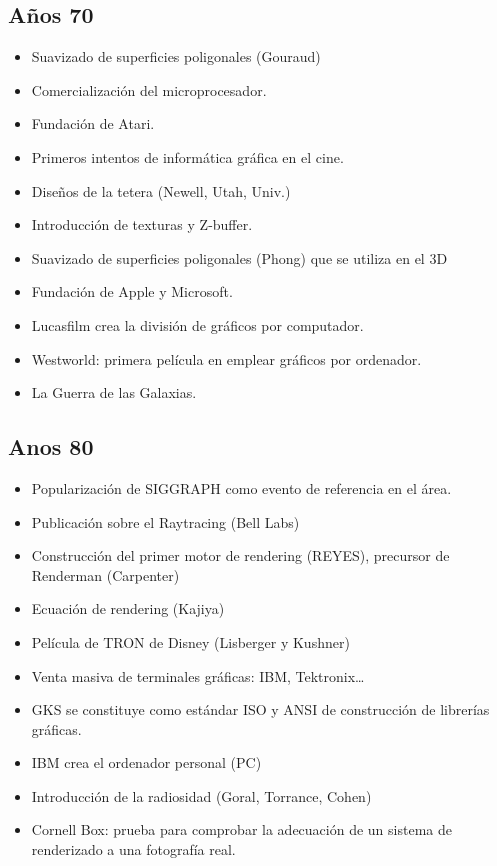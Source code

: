 \subsection{Años 70}\label{subsec:años-70}
\begin{itemize}
	\item Suavizado de superficies poligonales (Gouraud)
	\item Comercialización del microprocesador.
	\item Fundación de Atari.
	\item Primeros intentos de informática gráfica en el cine.
	\item Diseños de la tetera (Newell, Utah, Univ.)
	\item Introducción de texturas y Z-buffer.
	\item Suavizado de superficies poligonales (Phong) que se utiliza en el 3D
	\item Fundación de Apple y Microsoft.
	\item Lucasfilm crea la división de gráficos por computador.
	\item Westworld: primera película en emplear gráficos por ordenador.
	\item La Guerra de las Galaxias.
\end{itemize}

\subsection{Anos 80}\label{subsec:anos-80}
\begin{itemize}
	\item Popularización de SIGGRAPH como evento de referencia en el área.
	\item Publicación sobre el Raytracing (Bell Labs)
	\item Construcción del primer motor de rendering (REYES), precursor de Renderman (Carpenter)
	\item Ecuación de rendering (Kajiya)
	\item Película de TRON de Disney (Lisberger y Kushner)
	\item Venta masiva de terminales gráficas: IBM, Tektronix\ldots
	\item GKS se constituye como estándar ISO y ANSI de construcción de librerías gráficas.
	\item IBM crea el ordenador personal (PC)
	\item Introducción de la radiosidad (Goral, Torrance, Cohen)
	\item Cornell Box: prueba para comprobar la adecuación de un sistema de renderizado a una fotografía real.
\end{itemize}

